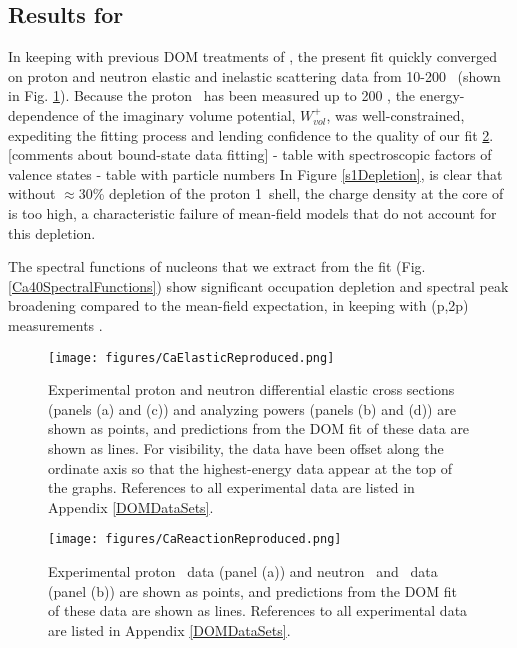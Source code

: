\subsection{Results for \caForty}
In keeping with previous DOM treatments of \caForty \cite{MahzoonPhDThesis}, the present fit
quickly converged on proton and neutron elastic and inelastic scattering data from 10-200
\mega\electronvolt\ (shown in Fig. \ref{CaElasticReproduced}). Because the \caForty proton \rxn\ has been
measured up to 200 \mega\electronvolt, the energy-dependence of the imaginary volume potential, $W_{vol}^{+}$, was
well-constrained, expediting the fitting process and lending confidence to the quality of our fit
\ref{CaReactionReproduced}. 
[comments about bound-state data fitting]
- table with spectroscopic factors of valence states
- table with particle numbers
In Figure \ref{s1Depletion}, is clear that without $\approx$30\%
depletion of the proton 1\sOne\ shell, the charge density at the core of
\caForty is too high,
a characteristic failure of mean-field models that do not account for this depletion. 

The spectral functions of \caForty nucleons that 
we extract from the fit (Fig. \ref{Ca40SpectralFunctions}) show significant occupation depletion and 
spectral peak broadening compared 
to the mean-field expectation, in keeping with (p,2p) measurements \cite{LiverpoolCa40}.

\begin{figure}[tb]
    \centering
    \texttt{[image: figures/CaElasticReproduced.png]}
    \caption[Nucleon differential cross sections of \caForty: DOM predictions and experimental data]
    {
        Experimental \caForty proton and neutron differential elastic cross sections
        (panels (a) and (c)) and analyzing powers (panels (b) and (d)) are shown as points, and 
        predictions from the DOM \caForty fit of these data are shown as lines. For visibility, the 
        data have been offset along the ordinate axis so that the highest-energy data
        appear at the top of the graphs. References to all experimental data are listed
        in Appendix \ref{DOMDataSets}.
    }
    \label{CaElasticReproduced}
\end{figure}

\begin{figure}[tb]
    \centering
    \texttt{[image: figures/CaReactionReproduced.png]}
    \caption[Nucleon \rxn\ of \caForty: DOM predictions and experimental data]
    {
        Experimental \caForty proton \rxn\ data (panel (a)) and neutron \tot\ and \rxn\ data (panel
        (b)) are shown as points, and 
        predictions from the DOM \caForty fit of these data are shown as lines.
        References to all experimental data are listed in Appendix \ref{DOMDataSets}.
    }
    \label{CaReactionReproduced}
\end{figure}

